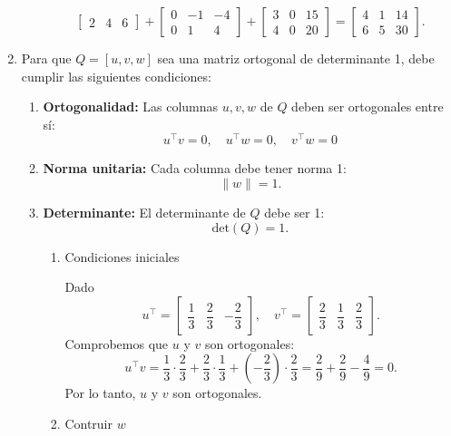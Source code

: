 \begin{enumerate}[label=\color{red}\textbf{\arabic*)}]
\begin{enumerate}[label=Paso \arabic*:]
\[\begin{bmatrix}
        2 & 4 & 6
    \end{bmatrix}+\begin{bmatrix} 
        0 & -1 & -4\\
        0 & 1 & 4
    \end{bmatrix}+\begin{bmatrix} 
        3 & 0 & 15\\
        4 & 0 & 20
    \end{bmatrix} =\begin{bmatrix} 
        4 & 1 & 14\\
        6 & 5 & 30
    \end{bmatrix} .  
    \] 
\end{enumerate}
\item {}

    Para que $Q=[u,v,w]$ sea una matriz ortogonal de determinante 1, debe cumplir las siguientes condiciones:
     \begin{enumerate}[label=\arabic*)]
        \item \textbf{Ortogonalidad:} Las columnas $u,v,w$ de  $Q$ deben ser ortogonales entre sí:  \[
        u^\intercal v=0,\quad u^\intercal w=0,\quad v^\intercal w=0
        \]  
    \item \textbf{Norma unitaria:} Cada columna debe tener norma 1: \[
    \|w\|=1.
    \]  
\item \textbf{Determinante:} El determinante de $Q$ debe ser 1:  \[
\mathrm{det}(Q)=1.
\]   
\begin{enumerate}[label=Paso \arabic*:]
    \item Condiciones iniciales

        Dado \[
        u^\intercal=\begin{bmatrix} 
            \dfrac{1}{3} & \dfrac{2}{3} & -\dfrac{2}{3} 
        \end{bmatrix} ,\quad v^\intercal=\begin{bmatrix} 
            \dfrac{2}{3} & \dfrac{1}{3} & \dfrac{2}{3} 
        \end{bmatrix} .
        \] 
        Comprobemos que $u$ y  $v$ son ortogonales:  \[
        u^\intercal v=\dfrac{1}{3}\cdot \dfrac{2}{3}+\dfrac{2}{3}\cdot \dfrac{1}{3}+\left( -\dfrac{2}{3} \right) \cdot \dfrac{2}{3}=\dfrac{2}{9}+\dfrac{2}{9}-\dfrac{4}{9}=0.
        \] 
        Por lo tanto, $u$ y  $v$ son ortogonales. 
    \item Contruir $w$


\end{enumerate}
\end{enumerate}
\end{enumerate}
